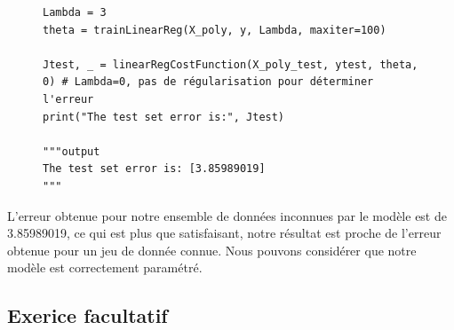 \begin{figure}[!h]
\begin{verbatim}
Lambda = 3
theta = trainLinearReg(X_poly, y, Lambda, maxiter=100)

Jtest, _ = linearRegCostFunction(X_poly_test, ytest, theta, 0) # Lambda=0, pas de régularisation pour déterminer l'erreur
print("The test set error is:", Jtest)

"""output
The test set error is: [3.85989019]
"""
\end{verbatim}   
\end{figure}

L'erreur obtenue pour notre ensemble de données inconnues par le modèle est de 3.85989019, ce qui est plus que satisfaisant, notre résultat est proche de l'erreur obtenue pour un jeu de donnée connue. Nous pouvons considérer que notre modèle est correctement 
paramétré.

\vspace{.5cm}
    
\subsection{Exerice facultatif}

